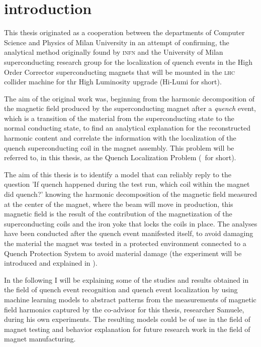 \chapter{introduction}
This thesis originated as a cooperation between the departments of Computer Science and Physics of
Milan University in an attempt of confirming, the analytical method originally found by
\textsc{infn} and the University of Milan superconducting research group for the localization of
quench events in the High Order Corrector superconducting magnets \cite{mariotto2022}
\cite{mariotto2022-generic} that will be mounted in the \textsc{lhc} collider machine for thr High
Luminosity upgrade \cite{rossi2024} (Hi-Lumi for short).

The aim of the original work was, beginning from the harmonic decomposition of the magnetic
field produced by the superconducting magnet after a \emph{quench} event, which is a transition of the
material from the superconducting state to the normal conducting state, to find an analytical
explanation for the reconstructed harmonic content and correlate the information with the
localization of the quench superconducting coil in the magnet assembly. This problem will be
referred to, in this thesis, as the Quench Localization Problem (\qlp\ for short).

The aim of this thesis is to identify a model that can reliably reply to the question 'If quench
happened during the test run, which coil within the magnet did quench?' knowing the harmonic
decomposition of the magnetic field measured at the center of the magnet, where the beam will move
in production, this magnetic field is the result of the contribution of the magnetization of the
superconducting coils and the iron yoke that locks the coils in place. The analyses have been
conducted after the quench event manifested itself, to avoid damaging the material the magnet was
tested in a protected environment connected to a Quench Protection System to avoid material damage
(the experiment will be introduced and explained in ).

\smallskip

In the following I will be explaining some of the studies and results obtained in the field of
quench event recognition and quench event localization by using machine learning models to abstract
patterns from the measurements of magnetic field harmonics captured by the co-advisor for this
thesis, researcher Samuele, during his own experiments. The resulting models could be of use in the field of magnet testing and behavior explanation for future research work in the field of magnet manufacturing.

